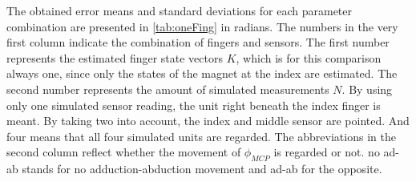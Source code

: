 The obtained error means and standard deviations for each parameter combination are presented in \ref{tab:oneFing} in radians. The numbers in the very first column indicate the combination of fingers and sensors. The first number represents the estimated finger state vectors $ K $, which is for this comparison always one, since only the states of the magnet at the index are estimated. The second number represents the amount of simulated measurements $ N $. By using only one simulated sensor reading, the unit right beneath the index finger is meant. By taking two into account, the index and middle sensor are pointed. And four means that all four simulated units are regarded. The abbreviations in the second column reflect whether the movement of $ \phi_{MCP} $ is regarded or not. \grqq no ad-ab \grqq stands for no adduction-abduction movement and \grqq ad-ab \grqq for the opposite. \\
